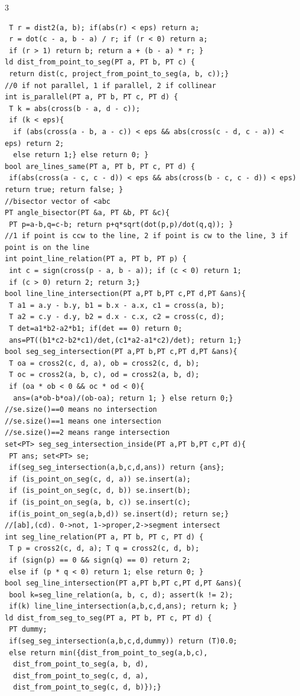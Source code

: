 \documentclass[8pt,a4paper,onesided]{article}
\begin{document}
\begin{multicols}{3}
\begin{verbatim}
 T r = dist2(a, b); if(abs(r) < eps) return a;
 r = dot(c - a, b - a) / r; if (r < 0) return a;
 if (r > 1) return b; return a + (b - a) * r; }
ld dist_from_point_to_seg(PT a, PT b, PT c) {
 return dist(c, project_from_point_to_seg(a, b, c));}
//0 if not parallel, 1 if parallel, 2 if collinear
int is_parallel(PT a, PT b, PT c, PT d) {
 T k = abs(cross(b - a, d - c));
 if (k < eps){
  if (abs(cross(a - b, a - c)) < eps && abs(cross(c - d, c - a)) < eps) return 2;
  else return 1;} else return 0; }
bool are_lines_same(PT a, PT b, PT c, PT d) {
 if(abs(cross(a - c, c - d)) < eps && abs(cross(b - c, c - d)) < eps) return true; return false; }
//bisector vector of <abc
PT angle_bisector(PT &a, PT &b, PT &c){
 PT p=a-b,q=c-b; return p+q*sqrt(dot(p,p)/dot(q,q)); }
//1 if point is ccw to the line, 2 if point is cw to the line, 3 if point is on the line
int point_line_relation(PT a, PT b, PT p) {
 int c = sign(cross(p - a, b - a)); if (c < 0) return 1;
 if (c > 0) return 2; return 3;}
bool line_line_intersection(PT a,PT b,PT c,PT d,PT &ans){
 T a1 = a.y - b.y, b1 = b.x - a.x, c1 = cross(a, b);
 T a2 = c.y - d.y, b2 = d.x - c.x, c2 = cross(c, d);
 T det=a1*b2-a2*b1; if(det == 0) return 0;
 ans=PT((b1*c2-b2*c1)/det,(c1*a2-a1*c2)/det); return 1;}
bool seg_seg_intersection(PT a,PT b,PT c,PT d,PT &ans){
 T oa = cross2(c, d, a), ob = cross2(c, d, b);
 T oc = cross2(a, b, c), od = cross2(a, b, d);
 if (oa * ob < 0 && oc * od < 0){
  ans=(a*ob-b*oa)/(ob-oa); return 1; } else return 0;}
//se.size()==0 means no intersection
//se.size()==1 means one intersection
//se.size()==2 means range intersection
set<PT> seg_seg_intersection_inside(PT a,PT b,PT c,PT d){
 PT ans; set<PT> se;
 if(seg_seg_intersection(a,b,c,d,ans)) return {ans};
 if (is_point_on_seg(c, d, a)) se.insert(a);
 if (is_point_on_seg(c, d, b)) se.insert(b);
 if (is_point_on_seg(a, b, c)) se.insert(c);
 if(is_point_on_seg(a,b,d)) se.insert(d); return se;}
//[ab],(cd). 0->not, 1->proper,2->segment intersect
int seg_line_relation(PT a, PT b, PT c, PT d) {
 T p = cross2(c, d, a); T q = cross2(c, d, b);
 if (sign(p) == 0 && sign(q) == 0) return 2;
 else if (p * q < 0) return 1; else return 0; }
bool seg_line_intersection(PT a,PT b,PT c,PT d,PT &ans){
 bool k=seg_line_relation(a, b, c, d); assert(k != 2);
 if(k) line_line_intersection(a,b,c,d,ans); return k; }
ld dist_from_seg_to_seg(PT a, PT b, PT c, PT d) {
 PT dummy;
 if(seg_seg_intersection(a,b,c,d,dummy)) return (T)0.0;
 else return min({dist_from_point_to_seg(a,b,c),
  dist_from_point_to_seg(a, b, d), 
  dist_from_point_to_seg(c, d, a),
  dist_from_point_to_seg(c, d, b)});}

\end{verbatim}
\end{multicols}
\end{document}
